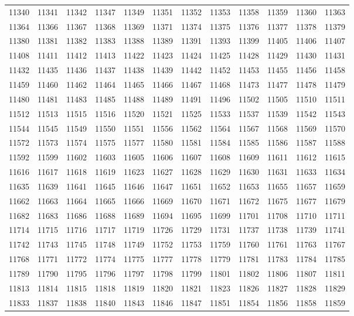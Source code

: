 \begin{center}
\begin{longtable}{llllllllllll}
11340 &11341 &11342 &11347 &11349 &11351 &11352 &11353 &11358 &11359 &11360 &11363 \\
11364 &11366 &11367 &11368 &11369 &11371 &11374 &11375 &11376 &11377 &11378 &11379 \\
11380 &11381 &11382 &11383 &11388 &11389 &11391 &11393 &11399 &11405 &11406 &11407 \\
11408 &11411 &11412 &11413 &11422 &11423 &11424 &11425 &11428 &11429 &11430 &11431 \\
11432 &11435 &11436 &11437 &11438 &11439 &11442 &11452 &11453 &11455 &11456 &11458 \\
11459 &11460 &11462 &11464 &11465 &11466 &11467 &11468 &11473 &11477 &11478 &11479 \\
11480 &11481 &11483 &11485 &11488 &11489 &11491 &11496 &11502 &11505 &11510 &11511 \\
11512 &11513 &11515 &11516 &11520 &11521 &11525 &11533 &11537 &11539 &11542 &11543 \\
11544 &11545 &11549 &11550 &11551 &11556 &11562 &11564 &11567 &11568 &11569 &11570 \\
11572 &11573 &11574 &11575 &11577 &11580 &11581 &11584 &11585 &11586 &11587 &11588 \\
11592 &11599 &11602 &11603 &11605 &11606 &11607 &11608 &11609 &11611 &11612 &11615 \\
11616 &11617 &11618 &11619 &11623 &11627 &11628 &11629 &11630 &11631 &11633 &11634 \\
11635 &11639 &11641 &11645 &11646 &11647 &11651 &11652 &11653 &11655 &11657 &11659 \\
11662 &11663 &11664 &11665 &11666 &11669 &11670 &11671 &11672 &11675 &11677 &11679 \\
11682 &11683 &11686 &11688 &11689 &11694 &11695 &11699 &11701 &11708 &11710 &11711 \\
11714 &11715 &11716 &11717 &11719 &11726 &11729 &11731 &11737 &11738 &11739 &11741 \\
11742 &11743 &11745 &11748 &11749 &11752 &11753 &11759 &11760 &11761 &11763 &11767 \\
11768 &11771 &11772 &11774 &11775 &11777 &11778 &11779 &11781 &11783 &11784 &11785 \\
11789 &11790 &11795 &11796 &11797 &11798 &11799 &11801 &11802 &11806 &11807 &11811 \\
11813 &11814 &11815 &11818 &11819 &11820 &11821 &11823 &11826 &11827 &11828 &11829 \\
11833 &11837 &11838 &11840 &11843 &11846 &11847 &11851 &11854 &11856 &11858 &11859 \\

\end{longtable}
\end{center}

